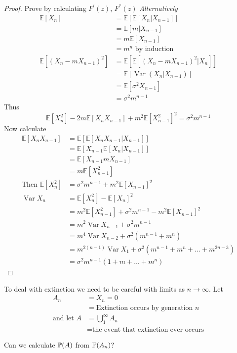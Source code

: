 \documentclass{notes}
\theoremstyle{plain}
\newcommand{\bP}{\mathbb{P}}
\newcommand{\bE}{\mathbb{E}}
\newcommand{\prob}[1]{\bP \negthinspace\left(#1\right)}
\newcommand{\expect}[1]{\bE\!\left[#1\right]}
\DeclareMathOperator{\var}{Var}
\begin{document}
\begin{proof}
Prove by calculating $F^{'}(z)$, $F^{''}(z)$
\emph{Alternatively}
\begin{align*}
\expect{X_n} &=\expect{\expect{X_n|X_{n-1}}}\\
&= \expect{m|X_{n-1}}\\
&=m\expect{X_{n-1}} \\
&=m^n \text{ by induction} \\
\expect{(X_n - mX_{n-1})^2} &= \expect{\expect{(X_n - mX_{n-1})^2|X_n}}\\
&= \expect{\var{(X_n|X_{n-1})}}\\
&= \expect{\sigma^2X_{n-1}}\\
&= \sigma^2m^{n-1}
\end{align*}
Thus
\[
\expect{X_n^2} - 2m\expect{X_nX_{n-1}} + m^2\expect{X_{n-1}^2}^2 
= \sigma^2m^{n-1}
\]
Now calculate
\begin{align*}
\expect{X_nX_{n-1}} &= \expect{\expect{X_nX_{n-1}|X_{n-1}}}\\
&=\expect{X_{n-1}\expect{X_n|X_{n-1}}}\\
&=\expect{X_{n-1}mX_{n-1}}\\
&=m\expect{X_{n-1}^2}\\
\text{Then }\expect{X_{n}^2} &= \sigma^2m^{n-1} + m^2\expect{X_{n-1}}^2\\
\var{X_n} &= \expect{X_n^2} - \expect{X_n}^2\\
&= m^2\expect{X_{n-1}^2} + \sigma^2m^{n-1} - m^2 \expect{X_{n-1}}^2\\
&= m^2\var{X_{n-1}} +  \sigma^2m^{n-1}\\
&= m^4\var{X_{n-2}} + \sigma^2(m^{n-1} + m^n)\\
&= m^{2(n-1)}\var{X_1} + \sigma^2(m^{n-1} + m^n +\dots + m^{2n-3})\\
&=\sigma^2m^{n-1}(1 + m + \dots + m^n)
\end{align*}
\end{proof}
To deal with extinction we need to be careful with limits as
 $n \to \infty$. Let
\begin{align*}
A_n &= {X_n = 0}\\
&={\text{Extinction occurs by generation $n$}}\\
\text{and let } A &= \bigcup_{1}^{\infty}A_n\\
&= \text{the event that extinction ever occurs}
\end{align*}

Can we calculate $\prob{A}$ from $\prob{A_n}$?
\end{document}
